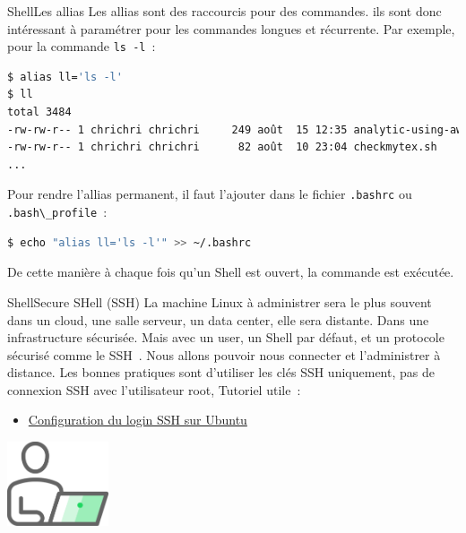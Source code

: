 \documentclass{beamer}
\begin{document}
    \begin{frame}[fragile]{Shell}{Les allias}
        Les allias sont des raccourcis pour des commandes.
        ils sont donc intéressant à paramétrer pour les commandes longues et récurrente.
        \bigbreak
        Par exemple, pour la commande \lstinline{ls -l}~:
        \begin{lstlisting}[language=bash]
$ alias ll='ls -l'
$ ll
total 3484
-rw-rw-r-- 1 chrichri chrichri     249 août  15 12:35 analytic-using-awk.sh
-rw-rw-r-- 1 chrichri chrichri      82 août  10 23:04 checkmytex.sh
...
        \end{lstlisting}
        \bigbreak
        Pour rendre l'allias permanent, il faut l'ajouter dans le fichier \lstinline{.bashrc} ou \lstinline{.bash\_profile}~:
        \begin{lstlisting}[language=bash]
$ echo "alias ll='ls -l'" >> ~/.bashrc
        \end{lstlisting}
        De cette manière à chaque fois qu'un Shell est ouvert, la commande est exécutée.
    \end{frame}

    \begin{frame}{Shell}{Secure SHell (SSH)}
        La machine Linux à administrer sera le plus souvent dans un cloud, une salle serveur, un data center, elle sera distante.
        Dans une infrastructure sécurisée.
        \bigbreak
        Mais avec un user, un Shell par défaut, et un protocole sécurisé comme le SSH~.
        Nous allons pouvoir nous connecter et l'administrer à distance.
        \bigbreak
        Les bonnes pratiques sont d'utiliser les clés SSH uniquement, pas de connexion SSH avec l'utilisateur root,
        Tutoriel utile~:
        \begin{itemize}
            \item \href{https://phoenixnap.com/kb/generate-setup-ssh-key-ubuntu}{Configuration du login SSH sur Ubuntu}
        \end{itemize}
        \bigbreak
        \centering
        \includegraphics[width=3cm]{image/guy-in-front-of-desktop}
    \end{frame}
\end{document}
